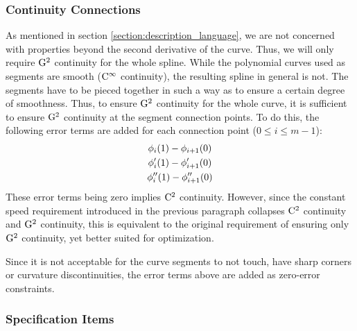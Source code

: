 \documentclass[a4paper]{article}
\begin{document}
			\subsubsection{Continuity Connections}
			\label{section:continuity_connections}

				As mentioned in section \ref{section:description_language}, we are not concerned with properties beyond the second derivative of the curve. Thus, we will only require \(\mathrm{G}^{2}\) continuity for the whole spline. While the polynomial curves used as segments are smooth (\(\mathrm{C}^{\infty}\) continuity), the resulting spline in general is not. The segments have to be pieced together in such a way as to ensure a certain degree of smoothness. Thus, to ensure \(\mathrm{G}^{2}\) continuity for the whole curve, it is sufficient to ensure \(\mathrm{G}^{2}\) continuity at the segment connection points. To do this, the following error terms are added for each connection point (\(0 \leq i \leq m - 1\)):
				\begin{equation*}
					\begin{gathered}
						\phi_i\!\left( 1 \right) - \phi_{i + 1}\!\left( 0 \right)\\
						\phi'_i\!\left( 1 \right) - \phi'_{i + 1}\!\left( 0 \right)\\
						\phi''_i\!\left( 1 \right) - \phi''_{i + 1}\!\left( 0 \right)
					\end{gathered}
				\end{equation*}
				These error terms being zero implies \(\mathrm{C}^{2}\) continuity. However, since the constant speed requirement introduced in the previous paragraph collapses \(\mathrm{C}^{2}\) continuity and \(\mathrm{G}^{2}\) continuity, this is equivalent to the original requirement of ensuring only \(\mathrm{G}^{2}\) continuity, yet better suited for optimization. 

				Since it is not acceptable for the curve segments to not touch, have sharp corners or curvature discontinuities, the error terms above are added as zero-error constraints.

			\subsubsection{Specification Items}
			\label{section:specification_items}
\end{document}
